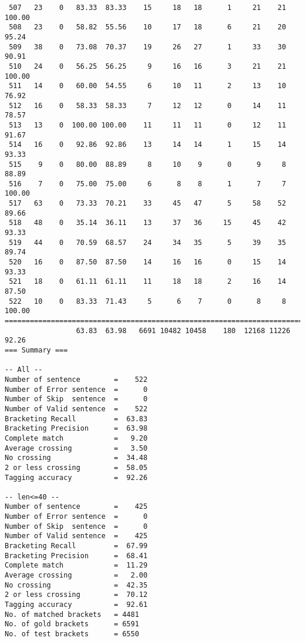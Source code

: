 \begin{verbatim}
 507   23    0   83.33  83.33    15     18   18      1     21    21   100.00
 508   23    0   58.82  55.56    10     17   18      6     21    20    95.24
 509   38    0   73.08  70.37    19     26   27      1     33    30    90.91
 510   24    0   56.25  56.25     9     16   16      3     21    21   100.00
 511   14    0   60.00  54.55     6     10   11      2     13    10    76.92
 512   16    0   58.33  58.33     7     12   12      0     14    11    78.57
 513   13    0  100.00 100.00    11     11   11      0     12    11    91.67
 514   16    0   92.86  92.86    13     14   14      1     15    14    93.33
 515    9    0   80.00  88.89     8     10    9      0      9     8    88.89
 516    7    0   75.00  75.00     6      8    8      1      7     7   100.00
 517   63    0   73.33  70.21    33     45   47      5     58    52    89.66
 518   48    0   35.14  36.11    13     37   36     15     45    42    93.33
 519   44    0   70.59  68.57    24     34   35      5     39    35    89.74
 520   16    0   87.50  87.50    14     16   16      0     15    14    93.33
 521   18    0   61.11  61.11    11     18   18      2     16    14    87.50
 522   10    0   83.33  71.43     5      6    7      0      8     8   100.00
============================================================================
                 63.83  63.98   6691 10482 10458    180  12168 11226    92.26
=== Summary ===

-- All --
Number of sentence        =    522
Number of Error sentence  =      0
Number of Skip  sentence  =      0
Number of Valid sentence  =    522
Bracketing Recall         =  63.83
Bracketing Precision      =  63.98
Complete match            =   9.20
Average crossing          =   3.50
No crossing               =  34.48
2 or less crossing        =  58.05
Tagging accuracy          =  92.26

-- len<=40 --
Number of sentence        =    425
Number of Error sentence  =      0
Number of Skip  sentence  =      0
Number of Valid sentence  =    425
Bracketing Recall         =  67.99
Bracketing Precision      =  68.41
Complete match            =  11.29
Average crossing          =   2.00
No crossing               =  42.35
2 or less crossing        =  70.12
Tagging accuracy          =  92.61
No. of matched brackets   = 4481
No. of gold brackets      = 6591
No. of test brackets      = 6550

\end{verbatim}

\normalsize

